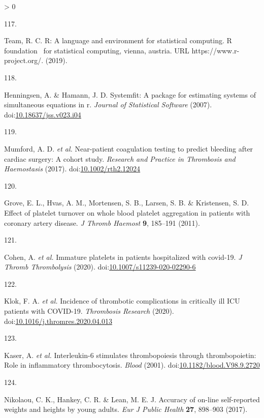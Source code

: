 \documentclass[11pt,twoside]{bristolthesis}
\newlength{\cslhangindent}
\newlength{\csllabelwidth}
\newenvironment{CSLReferences}[2] %
 {%
  \setlength{\parindent}{0pt}
  \ifodd #1 \everypar{\setlength{\hangindent}{\cslhangindent}}\ignorespaces\fi
  \ifnum #2 > 0
  \setlength{\parskip}{#2\baselineskip}
  \fi
 }%
 {}
\newcommand{\CSLLeftMargin}[1]{\parbox[t]{\csllabelwidth}{#1}}
\newcommand{\CSLRightInline}[1]{\parbox[t]{\linewidth - \csllabelwidth}{#1}\break}
\begin{document}
\begin{CSLReferences}{0}{0}
\leavevmode\hypertarget{ref-Team2019a}{}%
\CSLLeftMargin{117. }
\CSLRightInline{Team, R. C. R: A language and environment for statistical computing. R foundation~ for statistical computing, vienna, austria. URL https://www.r-project.org/. (2019).}

\leavevmode\hypertarget{ref-Henningsen2007}{}%
\CSLLeftMargin{118. }
\CSLRightInline{Henningsen, A. \& Hamann, J. D. Systemfit: A package for estimating systems of simultaneous equations in r. \emph{Journal of Statistical Software} (2007). doi:\href{https://doi.org/10.18637/jss.v023.i04}{10.18637/jss.v023.i04}}

\leavevmode\hypertarget{ref-Mumford2017}{}%
\CSLLeftMargin{119. }
\CSLRightInline{Mumford, A. D. \emph{et al.} Near-patient coagulation testing to predict bleeding after cardiac surgery: A cohort study. \emph{Research and Practice in Thrombosis and Haemostasis} (2017). doi:\href{https://doi.org/10.1002/rth2.12024}{10.1002/rth2.12024}}

\leavevmode\hypertarget{ref-Grove2011a}{}%
\CSLLeftMargin{120. }
\CSLRightInline{Grove, E. L., Hvas, A. M., Mortensen, S. B., Larsen, S. B. \& Kristensen, S. D. Effect of platelet turnover on whole blood platelet aggregation in patients with coronary artery disease. \emph{J Thromb Haemost} \textbf{9}, 185--191 (2011).}

\leavevmode\hypertarget{ref-Cohen2020}{}%
\CSLLeftMargin{121. }
\CSLRightInline{Cohen, A. \emph{et al.} Immature platelets in patients hospitalized with covid-19. \emph{J Thromb Thrombolysis} (2020). doi:\href{https://doi.org/10.1007/s11239-020-02290-6}{10.1007/s11239-020-02290-6}}

\leavevmode\hypertarget{ref-Klok2020}{}%
\CSLLeftMargin{122. }
\CSLRightInline{Klok, F. A. \emph{et al.} Incidence of thrombotic complications in critically ill ICU patients with COVID-19. \emph{Thrombosis Research} (2020). doi:\href{https://doi.org/10.1016/j.thromres.2020.04.013}{10.1016/j.thromres.2020.04.013}}

\leavevmode\hypertarget{ref-Kaser2001}{}%
\CSLLeftMargin{123. }
\CSLRightInline{Kaser, A. \emph{et al.} Interleukin-6 stimulates thrombopoiesis through thrombopoietin: Role in inflammatory thrombocytosis. \emph{Blood} (2001). doi:\href{https://doi.org/10.1182/blood.V98.9.2720}{10.1182/blood.V98.9.2720}}

\leavevmode\hypertarget{ref-Nikolaou2017}{}%
\CSLLeftMargin{124. }
\CSLRightInline{Nikolaou, C. K., Hankey, C. R. \& Lean, M. E. J. Accuracy of on-line self-reported weights and heights by young adults. \emph{Eur J Public Health} \textbf{27}, 898--903 (2017).}


\end{CSLReferences}
\end{document}
